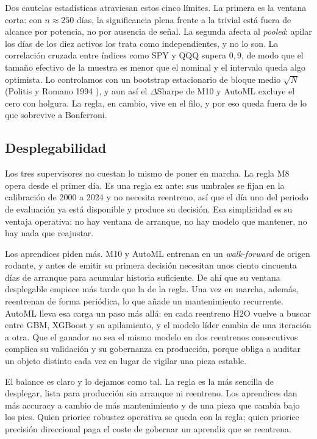 Dos cautelas estadísticas atraviesan estos cinco límites. La primera es la ventana corta: con $n \approx 250$ días, la significancia plena frente a la trivial está fuera de alcance por potencia, no por ausencia de señal. La segunda afecta al \emph{pooled}: apilar los días de los diez activos los trata como independientes, y no lo son. La correlación cruzada entre índices como SPY y QQQ supera $0{,}9$, de modo que el tamaño efectivo de la muestra es menor que el nominal y el intervalo queda algo optimista. Lo controlamos con un bootstrap estacionario de bloque medio $\sqrt{N}$ (Politis y Romano 1994 \cite{politis1994}), y aun así el $\Delta$Sharpe de M10 y AutoML excluye el cero con holgura. La regla, en cambio, vive en el filo, y por eso queda fuera de lo que sobrevive a Bonferroni.

\subsection{Desplegabilidad}
\label{sec:mp-lim-despliegue}

Los tres supervisores no cuestan lo mismo de poner en marcha. La regla M8 opera desde el primer día. Es una regla ex ante: sus umbrales se fijan en la calibración de 2000 a 2024 y no necesita reentreno, así que el día uno del periodo de evaluación ya está disponible y produce su decisión. Esa simplicidad es su ventaja operativa: no hay ventana de arranque, no hay modelo que mantener, no hay nada que reajustar.

Los aprendices piden más. M10 y AutoML entrenan en un \emph{walk-forward} de origen rodante, y antes de emitir su primera decisión necesitan unos ciento cincuenta días de arranque para acumular historia suficiente. De ahí que su ventana desplegable empiece más tarde que la de la regla. Una vez en marcha, además, reentrenan de forma periódica, lo que añade un mantenimiento recurrente. AutoML lleva esa carga un paso más allá: en cada reentreno H2O vuelve a buscar entre GBM, XGBoost y su apilamiento, y el modelo líder cambia de una iteración a otra. Que el ganador no sea el mismo modelo en dos reentrenos consecutivos complica su validación y su gobernanza en producción, porque obliga a auditar un objeto distinto cada vez en lugar de vigilar una pieza estable.

El balance es claro y lo dejamos como tal. La regla es la más sencilla de desplegar, lista para producción sin arranque ni reentreno. Los aprendices dan más accuracy a cambio de más mantenimiento y de una pieza que cambia bajo los pies. Quien priorice robustez operativa se queda con la regla; quien priorice precisión direccional paga el coste de gobernar un aprendiz que se reentrena.

